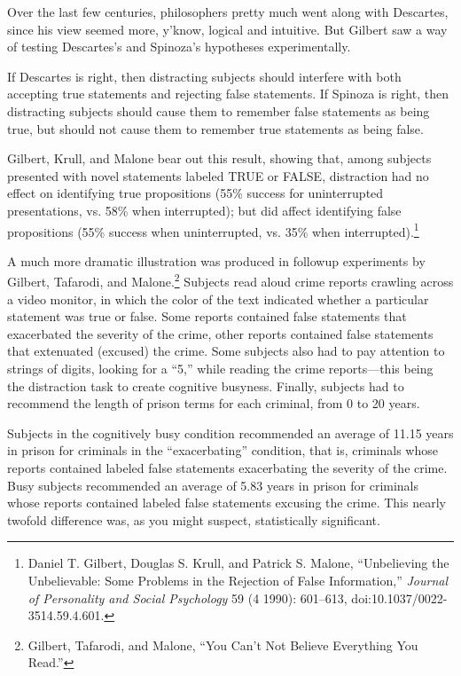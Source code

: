{
 Over the last few centuries, philosophers pretty much went along
with Descartes, since his view seemed more, y'know,
logical and intuitive. But Gilbert saw a way of testing
Descartes's and Spinoza's hypotheses
experimentally.}

{
 If Descartes is right, then distracting subjects should interfere
with both accepting true statements and rejecting false statements. If
Spinoza is right, then distracting subjects should cause them to
remember false statements as being true, but should not cause them to
remember true statements as being false.}

{
 Gilbert, Krull, and Malone bear out this result, showing that,
among subjects presented with novel statements labeled TRUE or FALSE,
distraction had no effect on identifying true propositions (55\%
success for uninterrupted presentations, vs. 58\% when interrupted);
but did affect identifying false propositions (55\% success when
uninterrupted, vs. 35\% when interrupted).\footnote{Daniel T. Gilbert, Douglas S. Krull, and Patrick S. Malone,
``Unbelieving the Unbelievable: Some Problems in the
Rejection of False Information,'' \textit{Journal of
Personality and Social Psychology} 59 (4 1990): 601--613,
doi:10.1037/0022-3514.59.4.601.}}

{
 A much more dramatic illustration was produced in followup
experiments by Gilbert, Tafarodi, and Malone.\footnote{Gilbert, Tafarodi, and Malone, ``You
Can't Not Believe Everything You
Read.''}
Subjects read aloud crime reports crawling across a video monitor, in
which the color of the text indicated whether a particular statement
was true or \textsf{false}. Some reports contained \textsf{false} statements that
exacerbated the severity of the crime, other reports contained \textsf{false}
statements that extenuated (excused) the crime. Some subjects also had
to pay attention to strings of digits, looking for a
``5,'' while reading the crime
reports---this being the distraction task to create cognitive busyness.
Finally, subjects had to recommend the length of prison terms for each
criminal, from 0 to 20 years.}

{
 Subjects in the cognitively busy condition recommended an average
of 11.15 years in prison for criminals in the
``exacerbating'' condition, that is,
criminals whose reports contained \textsf{labeled false statements exacerbating
the severity of the crime}. Busy subjects recommended an average of 5.83
years in prison for criminals whose reports contained \textsf{labeled false
statements excusing the crime}. This nearly twofold difference was, as
you might suspect, statistically significant.}

